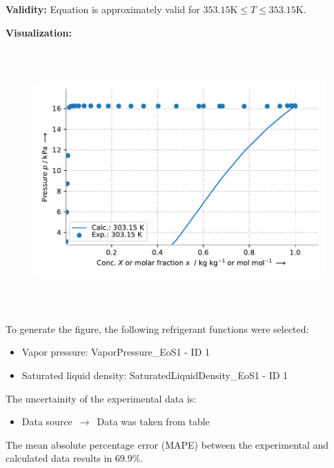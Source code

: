 \textbf{Validity:}
\newline
Equation is approximately valid for $353.15 \si{\kelvin} \leq T \leq 353.15 \si{\kelvin}$.
\newline

\textbf{Visualization:}
%
\begin{figure}[!htp]
{\noindent\includegraphics[height=10cm, keepaspectratio]{figs/abs/abs_Cyclohexane_inoic_liquid_[EMIM]+[C2H5OSO3]-_NrtlTemperatureDg_1.pdf}}
\end{figure}
%

To generate the figure, the following refrigerant functions were selected:
\begin{itemize}
\item Vapor pressure: VaporPressure\_EoS1 - ID 1
\item Saturated liquid density: SaturatedLiquidDensity\_EoS1 - ID 1
\end{itemize}

The uncertainity of the experimental data is:
\begin{itemize}
\item Data source $\,\to\,$ Data was taken from table
\end{itemize}

The mean absolute percentage error (MAPE) between the experimental and calculated data results in 69.9\%.
\FloatBarrier
\newpage
